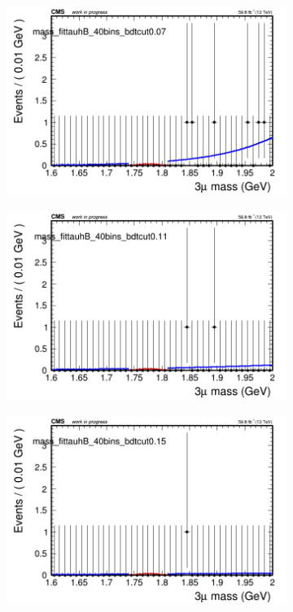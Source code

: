\begin{figure}[H]
\begin{subfigure}{0.2\textwidth}
        \includegraphics[width=\textwidth]{power_law/plots/tauhB/massfit_tauhB_40bins_bdtcut0.07.png}
        \caption{}
    \end{subfigure}
    \begin{subfigure}{0.2\textwidth}
        \includegraphics[width=\textwidth]{power_law/plots/tauhB/massfit_tauhB_40bins_bdtcut0.11.png}
        \caption{}
    \end{subfigure}
    \begin{subfigure}{0.2\textwidth}
        \includegraphics[width=\textwidth]{power_law/plots/tauhB/massfit_tauhB_40bins_bdtcut0.15.png}

\end{subfigure}
\end{figure}
